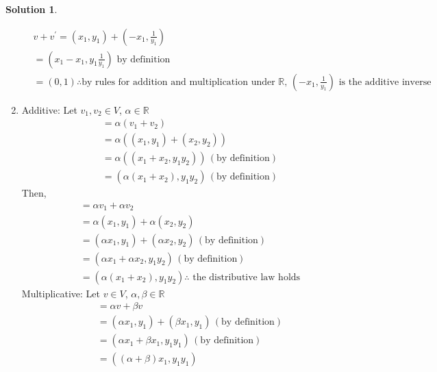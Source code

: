 \documentclass[10pt]{article}
\theoremstyle{definition}
\newtheorem{soln}{Solution}
\begin{document}
\begin{soln}
\begin{enumerate}[label=(\roman*)]
\begin{align*}
             & v+v^\prime = (x_1,y_1)+\left(-x_1,\frac{1}{y_1}\right)                                                                                                  \\
             & = \left(x_1-x_1,y_1\frac{1}{y_1}\right) \text{ by definition}                                                                                           \\
             & = (0,1) \therefore\text{by rules for addition and multiplication under } \mathbb{R},\, \left(-x_1, \frac{1}{y_1}\right) \text{ is the additive inverse}
          \end{align*}
    \item Additive:
          Let $v_1,v_2\in V$, $\alpha\in\mathbb{R}$
          \begin{align*}
             & = \alpha(v_1+v_2)                                    \\
             & = \alpha((x_1,y_1)+(x_2,y_2))                        \\
             & = \alpha((x_1+x_2,y_1y_2)) \, (\text{by definition}) \\
             & = (\alpha(x_1+x_2),y_1y_2) \, (\text{by definition})
          \end{align*}
          Then,
          \begin{align*}
             & = \alpha v_1+\alpha v_2                                                   \\
             & = \alpha(x_1,y_1)+\alpha(x_2,y_2)                                         \\
             & = (\alpha x_1,y_1)+(\alpha x_2,y_2) \, (\text{by definition})             \\
             & = (\alpha x_1+\alpha x_2,y_1y_2) \, (\text{by definition} )               \\
             & = (\alpha(x_1+ x_2),y_1y_2) \therefore \text{ the distributive law holds}
          \end{align*}
          Multiplicative:
          Let $v\in V$, $\alpha,\beta\in\mathbb{R}$
          \begin{align*}
             & = \alpha v+\beta v                                             \\
             & = (\alpha x_1, y_1)+(\beta x_1, y_1) \, (\text{by definition}) \\
             & = (\alpha x_1+\beta x_1, y_1y_1) \, (\text{by definition})     \\
             & = ((\alpha +\beta)x_1, y_1y_1)

\end{align*}
\end{enumerate}
\end{soln}
\end{document}
